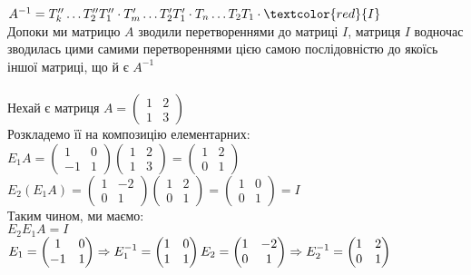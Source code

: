 \documentclass[a4paper, 10pt]{article}
\theoremstyle{theoremdd}
\begin{document}
	$A^{-1} = T_k'' \dots T_2'' T_1'' \cdot T_m' \dots T_2' T_1' \cdot T_n \dots T_2 T_1 \cdot \textcolor{red}{I}$\\
	Допоки ми матрицю $A$ зводили перетвореннями до матриці $I$, матриця $I$ водночас зводилась цими самими перетвореннями цією самою послідовністю до якоїсь іншої матриці, що й є $A^{-1}$\\
	\bigskip \\
	 Нехай є матриця $A = \begin{pmatrix} 1 & 2 \\ 1 & 3 \end{pmatrix}$\\
	Розкладемо її на композицію елементарних:\\
	$E_1 A = \begin{pmatrix}1 & 0 \\ -1 & 1 \end{pmatrix} \begin{pmatrix}1 & 2 \\ 1 & 3 \end{pmatrix} = \begin{pmatrix} 1 & 2 \\ 0 & 1 \end{pmatrix}$\\
	$E_2 (E_1 A) = \begin{pmatrix} 1 & -2 \\ 0 & 1 \end{pmatrix} \begin{pmatrix} 1 & 2 \\ 0 & 1 \end{pmatrix} = \begin{pmatrix}
	1 & 0 \\
	0 & 1
	\end{pmatrix} = I$\\
	Таким чином, ми маємо:\\
	$E_2 E_1 A = I$\\
	$E_1 = \begin{pmatrix}
	1 & 0 \\
	-1 & 1
	\end{pmatrix} \Rightarrow E_1^{-1} = \begin{pmatrix}
	1 & 0 \\
	1 & 1
\end{pmatrix}	 \\ E_2 = \begin{pmatrix}
	1 & -2 \\
	0 & 1
	\end{pmatrix} \Rightarrow E_2^{-1} = \begin{pmatrix}
	1 & 2 \\
	0 & 1
	\end{pmatrix}$\\
\end{document}
